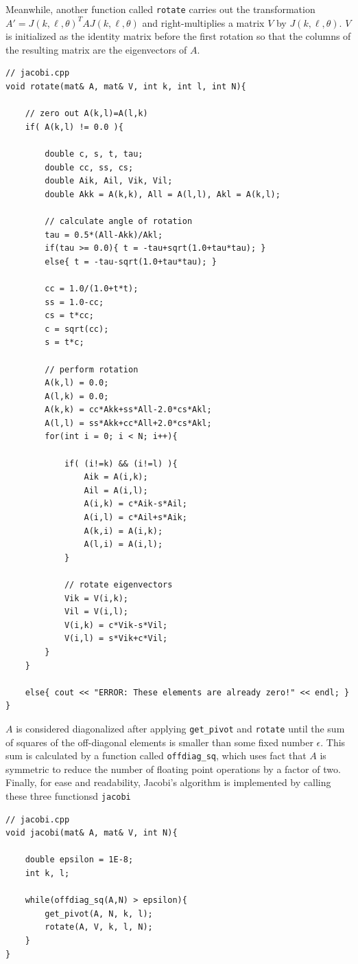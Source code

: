 \documentclass[prb,aps,twocolumn,showpacs,10pt]{revtex4-1}
\begin{document}
\noindent Meanwhile, another function called \texttt{rotate} carries out the transformation $A'=J(k,\ell,\theta)^TAJ(k,\ell,\theta)$ and right-multiplies a matrix $V$ by $J(k,\ell,\theta)$. $V$ is initialized as the identity matrix before the first rotation so that the columns of the resulting matrix are the eigenvectors of $A$. 

\begin{lstlisting}
// jacobi.cpp
void rotate(mat& A, mat& V, int k, int l, int N){

	// zero out A(k,l)=A(l,k)
	if( A(k,l) != 0.0 ){

		double c, s, t, tau;
		double cc, ss, cs;
		double Aik, Ail, Vik, Vil;
		double Akk = A(k,k), All = A(l,l), Akl = A(k,l);

		// calculate angle of rotation
		tau = 0.5*(All-Akk)/Akl;
		if(tau >= 0.0){ t = -tau+sqrt(1.0+tau*tau); }
		else{ t = -tau-sqrt(1.0+tau*tau); }

		cc = 1.0/(1.0+t*t);
		ss = 1.0-cc;
		cs = t*cc;
		c = sqrt(cc);
		s = t*c;

		// perform rotation
		A(k,l) = 0.0;
		A(l,k) = 0.0;
		A(k,k) = cc*Akk+ss*All-2.0*cs*Akl;
		A(l,l) = ss*Akk+cc*All+2.0*cs*Akl;
		for(int i = 0; i < N; i++){

			if( (i!=k) && (i!=l) ){
				Aik = A(i,k);
				Ail = A(i,l);
				A(i,k) = c*Aik-s*Ail;
				A(i,l) = c*Ail+s*Aik;
				A(k,i) = A(i,k);
				A(l,i) = A(i,l);
			}

			// rotate eigenvectors 
			Vik = V(i,k);
			Vil = V(i,l);
			V(i,k) = c*Vik-s*Vil;
			V(i,l) = s*Vik+c*Vil;
		}
	}

	else{ cout << "ERROR: These elements are already zero!" << endl; } 
}
\end{lstlisting}

\noindent $A$ is considered diagonalized after applying \texttt{get\_pivot} and \texttt{rotate} until the sum of squares of the off-diagonal elements is smaller than some fixed number $\epsilon$. This sum is calculated by a function called \texttt{offdiag\_sq}, which uses fact that $A$ is symmetric to reduce the number of floating point operations by a factor of two. Finally, for ease and readability, Jacobi's algorithm is implemented by calling these three functionsd \texttt{jacobi}

\begin{lstlisting}
// jacobi.cpp 
void jacobi(mat& A, mat& V, int N){

	double epsilon = 1E-8;
	int k, l;

	while(offdiag_sq(A,N) > epsilon){
		get_pivot(A, N, k, l);
		rotate(A, V, k, l, N);
	}
}
\end{lstlisting}
\end{document}
